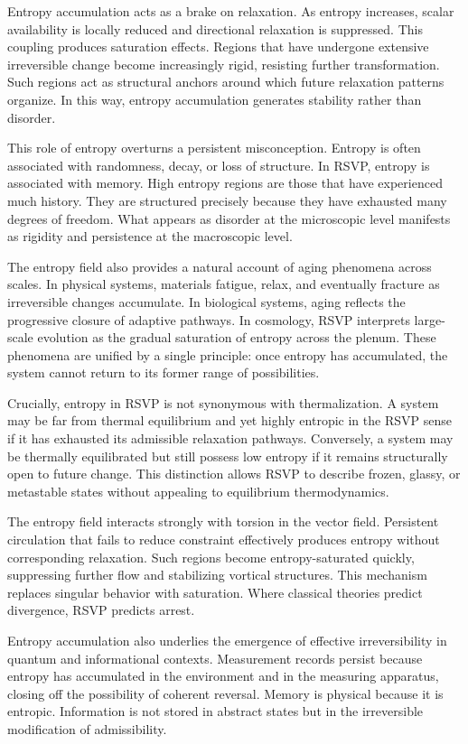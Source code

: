 \documentclass[11pt,oneside]{book}
\begin{document}
Entropy accumulation acts as a brake on relaxation. As entropy increases, scalar availability is locally reduced and directional relaxation is suppressed. This coupling produces saturation effects. Regions that have undergone extensive irreversible change become increasingly rigid, resisting further transformation. Such regions act as structural anchors around which future relaxation patterns organize. In this way, entropy accumulation generates stability rather than disorder.

This role of entropy overturns a persistent misconception. Entropy is often associated with randomness, decay, or loss of structure. In RSVP, entropy is associated with memory. High entropy regions are those that have experienced much history. They are structured precisely because they have exhausted many degrees of freedom. What appears as disorder at the microscopic level manifests as rigidity and persistence at the macroscopic level.

The entropy field also provides a natural account of aging phenomena across scales. In physical systems, materials fatigue, relax, and eventually fracture as irreversible changes accumulate. In biological systems, aging reflects the progressive closure of adaptive pathways. In cosmology, RSVP interprets large-scale evolution as the gradual saturation of entropy across the plenum. These phenomena are unified by a single principle: once entropy has accumulated, the system cannot return to its former range of possibilities.

Crucially, entropy in RSVP is not synonymous with thermalization. A system may be far from thermal equilibrium and yet highly entropic in the RSVP sense if it has exhausted its admissible relaxation pathways. Conversely, a system may be thermally equilibrated but still possess low entropy if it remains structurally open to future change. This distinction allows RSVP to describe frozen, glassy, or metastable states without appealing to equilibrium thermodynamics.

The entropy field interacts strongly with torsion in the vector field. Persistent circulation that fails to reduce constraint effectively produces entropy without corresponding relaxation. Such regions become entropy-saturated quickly, suppressing further flow and stabilizing vortical structures. This mechanism replaces singular behavior with saturation. Where classical theories predict divergence, RSVP predicts arrest.

Entropy accumulation also underlies the emergence of effective irreversibility in quantum and informational contexts. Measurement records persist because entropy has accumulated in the environment and in the measuring apparatus, closing off the possibility of coherent reversal. Memory is physical because it is entropic. Information is not stored in abstract states but in the irreversible modification of admissibility.
\end{document}
